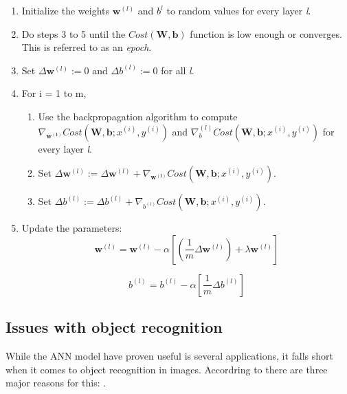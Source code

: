 \begin{enumerate}
	\item Initialize the weights $ \mathbf{w}^{(l)} $ and $ b^{l} $ to random values for every layer \textit{l}.
	\item Do steps 3 to 5 until the $ Cost(\mathbf{W, b}) $ function is low enough or converges. This is referred to as an \textit{epoch}. 
	\item Set $ \Delta\mathbf{w}^{(l)} := 0 $ and $ \Delta b^{(l)} := 0 $ for all \textit{l}.
	\item For i = 1 to m,
		\begin{enumerate}
			\item Use the backpropagation algorithm to compute $ \nabla_\mathbf{w^{(l)}}Cost(\mathbf{W, b};x^{(i)},y^{(i)}) $ and $ \nabla_b^{(l)}Cost(\mathbf{W, b};x^{(i)},y^{(i)}) $ for every layer \textit{l}.
			\item  Set $ \Delta\mathbf{w}^{(l)} := \Delta\mathbf{w}^{(l)} + \nabla_\mathbf{w^{(l)}}Cost(\mathbf{W, b};x^{(i)},y^{(i)}) $. 
			\item  Set $ \Delta b^{(l)} := \Delta b^{(l)} + \nabla_{b^{(l)}}Cost(\mathbf{W, b};x^{(i)},y^{(i)}) $. 
		\end{enumerate}
	\item Update the parameters:
		\begin{equation*}
			\mathbf{w}^{(l)} = \mathbf{w}^{(l)} - \alpha[(\frac{1}{m}\Delta\mathbf{w}^{(l)}) + \lambda\mathbf{w}^{(l)}]
		\end{equation*}
		
		\begin{equation*}
			b^{(l)} = b^{(l)} - \alpha[\frac{1}{m}\Delta b^{(l)}]
		\end{equation*}
\end{enumerate}

\subsection{Issues with object recognition}\label{ann_issues}

While the ANN model have proven useful is several applications, it falls short when it comes to object recognition in images. Accordring to \cite{LeCun1998} there are three major reasons for this: . 

